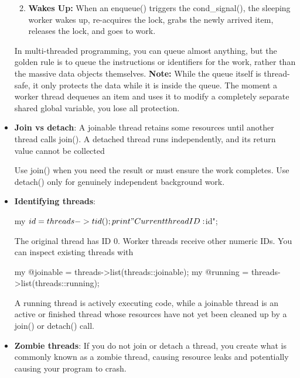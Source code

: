 \documentclass{report}
\begin{document}
\begin{itemize}
\begin{enumerate}
\begin{itemize}
                \end{itemize}
                \item \textbf{Wakes Up:} When an enqueue() triggers the cond\_signal(), the sleeping worker wakes up, re-acquires the lock, grabs the newly arrived item, releases the lock, and goes to work.
            \end{enumerate}
            In multi-threaded programming, you can queue almost anything, but the golden rule is to queue the instructions or identifiers for the work, rather than the massive data objects themselves.
            \bigbreak \noindent 
            \textbf{Note:} While the queue itself is thread-safe, it only protects the data while it is inside the queue.  The moment a worker thread dequeues an item and uses it to modify a completely separate shared global variable, you lose all protection.
        \item \textbf{Join vs detach}: A joinable thread retains some resources until another thread calls join(). A detached thread runs independently, and its return value cannot be collected
            \bigbreak \noindent 
            Use join() when you need the result or must ensure the work completes. Use detach() only for genuinely independent background work.
        \item \textbf{Identifying threads}: 
            \bigbreak \noindent 
            \begin{perlcode}
                my $id = threads->tid();
                print "Current thread ID: $id\n"; 
            \end{perlcode}
            \bigbreak \noindent 
            The original thread has ID 0. Worker threads receive other numeric IDs.
            \bigbreak \noindent 
            You can inspect existing threads with 
            \bigbreak \noindent 
            \begin{perlcode}
                my @joinable = threads->list(threads::joinable);
                my @running  = threads->list(threads::running);
            \end{perlcode}
            \bigbreak \noindent 
            A running thread is actively executing code, while a joinable thread is an active or finished thread whose resources have not yet been cleaned up by a join() or detach() call. 
        \item \textbf{Zombie threads}: If you do not join or detach a thread, you create what is commonly known as a zombie thread, causing resource leaks and potentially causing your program to crash.

\end{itemize}
\end{document}
